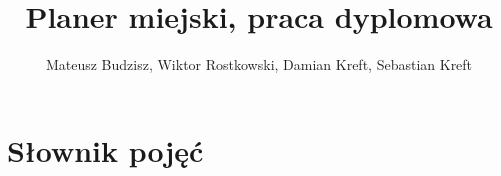 \documentclass{report}
\title{Planer miejski, praca dyplomowa}
\author{Mateusz Budzisz, Wiktor Rostkowski, Damian Kreft, Sebastian Kreft}
\begin{document}
	\maketitle
	\tableofcontents

	\clearpage

	

	
	

	\chapter{Słownik pojęć}
	\label{ch:slownik-pojec}
	\printglossary[type=\acronymtype]
	\printglossary
\end{document}
